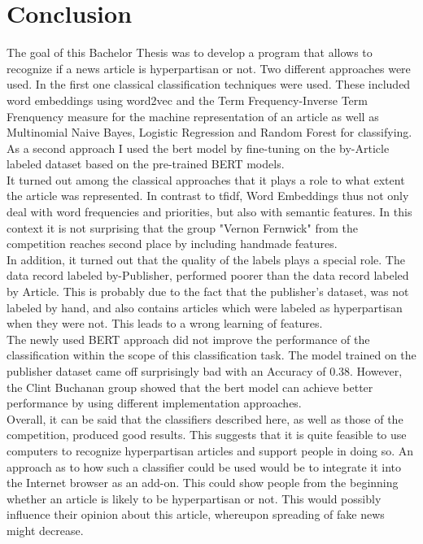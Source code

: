 \documentclass[a4paper, 11pt,titlepage,oneside,openany]{book}
\begin{document}
\chapter{Conclusion}
The goal of this Bachelor Thesis was to develop a program that allows to recognize if a news article is hyperpartisan or not. Two different approaches were used. In the first one classical classification techniques were used. These included word embeddings using word2vec and the Term Frequency-Inverse Term Frenquency measure for the machine representation of an article as well as Multinomial Naive Bayes, Logistic Regression and Random Forest for classifying. As a second approach I used the \gls{bert} model by fine-tuning on the by-Article labeled dataset based on the pre-trained BERT models. \\
\indent It turned out among the classical approaches that it plays a role to what extent the article was represented. In contrast to \gls{tfidf}, Word Embeddings thus not only deal with word frequencies and priorities, but also with semantic features. In this context it is not surprising that the group "Vernon Fernwick" from the competition reaches second place by including handmade features. \\
\indent In addition, it turned out that the quality of the labels plays a special role. The data record labeled by-Publisher, performed poorer than the data record labeled by Article. This is probably due to the fact that the publisher's dataset, was not labeled by hand, and also contains articles which were labeled as hyperpartisan when they were not. This leads to a wrong learning of features.\\
\indent The newly used BERT approach did not improve the performance of the classification within the scope of this classification task. The model trained on the publisher dataset came off surprisingly bad with an Accuracy of 0.38. However, the Clint Buchanan group showed that the \gls{bert} model can achieve better performance by using different implementation approaches.\\
\indent Overall, it can be said that the classifiers described here, as well as those of the competition, produced good results. This suggests that it is quite feasible to use computers to recognize hyperpartisan articles and support people in doing so.
An approach as to how such a classifier could be used would be to integrate it into the Internet browser as an add-on. This could show people from the beginning whether an article is likely to be hyperpartisan or not. This would possibly influence their opinion about this article, whereupon spreading of fake news might decrease.
\end{document}

